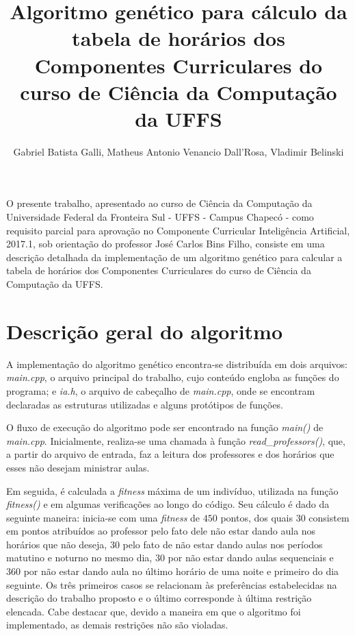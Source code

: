 \documentclass[12pt]{article}
\title{Algoritmo genético para cálculo da tabela de horários dos Componentes Curriculares do curso de Ciência da Computação da UFFS}
\author{Gabriel Batista Galli\inst{1}, Matheus Antonio Venancio Dall'Rosa\inst{1}, Vladimir Belinski\inst{1}}
\begin{document}
 

\maketitle
     
\begin{resumo} 
  O presente trabalho, apresentado ao curso de Ciência da Computação da Universidade Federal da Fronteira Sul - UFFS - Campus Chapecó - como requisito parcial para aprovação no Componente Curricular Inteligência Artificial, 2017.1, sob orientação do professor José Carlos Bins Filho, consiste em uma descrição detalhada da implementação de um algoritmo genético para calcular a tabela de horários dos Componentes Curriculares do curso de Ciência da Computação da UFFS.
\end{resumo}

\section{Descrição geral do algoritmo}

A implementação do algoritmo genético encontra-se distribuída em dois arquivos: \emph{main.cpp}, o arquivo principal do trabalho, cujo conteúdo engloba as funções do programa; e \emph{ia.h}, o arquivo de cabeçalho de \emph{main.cpp}, onde se encontram declaradas as estruturas utilizadas e alguns protótipos de funções.

O fluxo de execução do algoritmo pode ser encontrado na função \emph{main()} de \emph{main.cpp}. Inicialmente, realiza-se uma chamada à função \emph{read\_professors()}, que, a partir do arquivo de entrada, faz a leitura dos professores e dos horários que esses não desejam ministrar aulas.

Em seguida, é calculada a \textit{fitness} máxima de um indivíduo, utilizada na função \textit{fitness()} e em algumas verificações ao longo do código. Seu cálculo é dado da seguinte maneira: inicia-se com uma \textit{fitness} de $450$ pontos, dos quais $30$ consistem em pontos atribuídos ao professor pelo fato dele não estar dando aula nos horários que não deseja, $30$ pelo fato de não estar dando aulas nos períodos matutino e noturno no mesmo dia, $30$ por não estar dando aulas sequenciais e $360$ por não estar dando aula no último horário de uma noite e primeiro do dia seguinte. Os três primeiros casos se relacionam às preferências estabelecidas na descrição do trabalho proposto e o último corresponde à última restrição elencada. Cabe destacar que, devido a maneira em que o algoritmo foi implementado, as demais restrições não são violadas.
\end{document}
